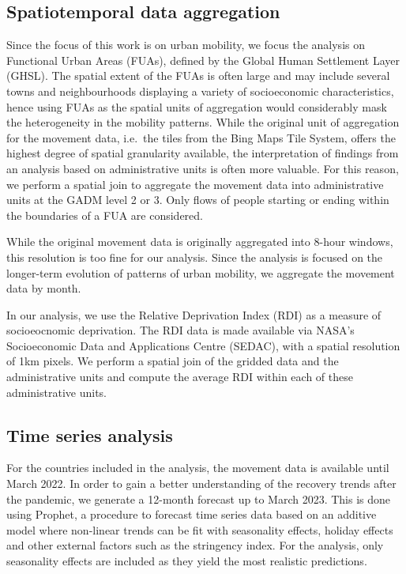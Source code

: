 \documentclass[
  11pt,
]{article}
\begin{document}
\subsection{Spatiotemporal data
aggregation}\label{spatiotemporal-data-aggregation}

Since the focus of this work is on urban mobility, we focus the analysis
on Functional Urban Areas (FUAs), defined by the Global Human Settlement
Layer (GHSL). The spatial extent of the FUAs is often large and may
include several towns and neighbourhoods displaying a variety of
socioeconomic characteristics, hence using FUAs as the spatial units of
aggregation would considerably mask the heterogeneity in the mobility
patterns. While the original unit of aggregation for the movement data,
i.e.~the tiles from the Bing Maps Tile System, offers the highest degree
of spatial granularity available, the interpretation of findings from an
analysis based on administrative units is often more valuable. For this
reason, we perform a spatial join to aggregate the movement data into
administrative units at the GADM level 2 or 3. Only flows of people
starting or ending within the boundaries of a FUA are considered.

While the original movement data is originally aggregated into 8-hour
windows, this resolution is too fine for our analysis. Since the
analysis is focused on the longer-term evolution of patterns of urban
mobility, we aggregate the movement data by month.

In our analysis, we use the Relative Deprivation Index (RDI) as a
measure of socioeocnomic deprivation. The RDI data is made available via
NASA's Socioeconomic Data and Applications Centre (SEDAC), with a
spatial resolution of 1km pixels. We perform a spatial join of the
gridded data and the administrative units and compute the average RDI
within each of these administrative units.

\subsection{Time series analysis}\label{time-series-analysis}

For the countries included in the analysis, the movement data is
available until March 2022. In order to gain a better understanding of
the recovery trends after the pandemic, we generate a 12-month forecast
up to March 2023. This is done using Prophet, a procedure to forecast
time series data based on an additive model where non-linear trends can
be fit with seasonality effects, holiday effects and other external
factors such as the stringency index. For the analysis, only seasonality
effects are included as they yield the most realistic predictions.
\end{document}
